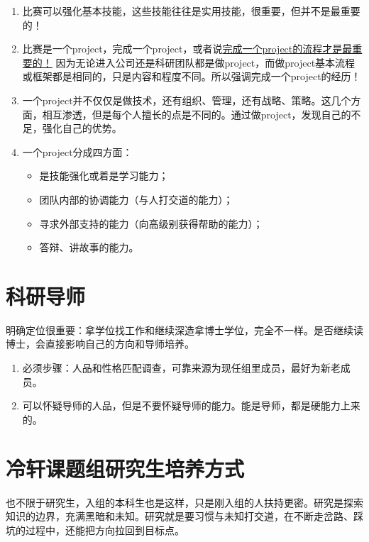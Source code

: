 \begin{enumerate}
\item 比赛可以强化基本技能，这些技能往往是实用技能，很重要，但并不是最重要的！

\item 比赛是一个project，完成一个project，或者说\underline{完成一个project的流程才是最重要的！}
因为无论进入公司还是科研团队都是做project，而做project基本流程或框架都是相同的，只是内容和程度不同。所以强调完成一个project的经历！

\item 一个project并不仅仅是做技术，还有组织、管理，还有战略、策略。这几个方面，相互渗透，但是每个人擅长的点是不同的。通过做project，发现自己的不足，强化自己的优势。

\item 一个project分成四方面：
\begin{itemize}
\item 是技能强化或着是学习能力；

\item 团队内部的协调能力（与人打交道的能力）；

\item 寻求外部支持的能力（向高级别获得帮助的能力）；

\item 答辩、讲故事的能力。
\end{itemize}

\end{enumerate}



\section{科研导师}
明确定位很重要：拿学位找工作和继续深造拿博士学位，完全不一样。是否继续读博士，会直接影响自己的方向和导师培养。

\begin{enumerate}
\item 必须步骤：人品和性格匹配调查，可靠来源为现任组里成员，最好为新老成员。
\item 可以怀疑导师的人品，但是不要怀疑导师的能力。能是导师，都是硬能力上来的。
\end{enumerate}


\section{冷轩课题组研究生培养方式}
也不限于研究生，入组的本科生也是这样，只是刚入组的人扶持更密。研究是探索知识的边界，充满黑暗和未知。研究就是要习惯与未知打交道，在不断走岔路、踩坑的过程中，还能把方向拉回到目标点。

